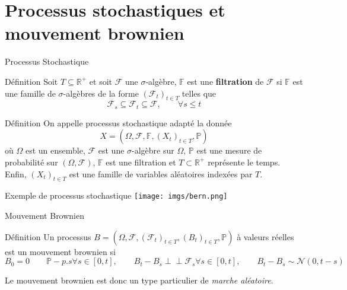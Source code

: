 \documentclass{beamer}
\newcommand{\1}{\mathmybb{1}}
\newcommand{\indep}{\perp \!\!\! \perp}
\begin{document}
\section{Processus stochastiques et mouvement brownien}
\begin{frame}{Processus Stochastique}
  \begin{block}{Définition}
    Soit $T \subseteq \mathbb{R}^{+}$ et soit $\mathcal{F}$ une $\sigma$-algèbre, $\mathbb{F}$ est une \textbf{filtration} de $\mathcal{F}$ si $\mathbb{F}$ est une famille de $\sigma$-algèbres de la forme $\left( \mathcal{F}_{t}\right)_{t\in T}$ telles que
    \[
      \mathcal{F}_{s} \subseteq \mathcal{F}_{t} \subseteq \mathcal{F}, \qquad \forall s \leq t
    \]
    \end{block}
  \begin{block}{Définition}
    On appelle processus stochastique adapté la donnée
    \begin{equation}
      X = (\varOmega, \mathcal{F}, \mathbb{F}, \left(  X_{t} \right)_{t\in T}, \mathbb{P})
    \end{equation}
    où $ \varOmega $ est un ensemble, $ \mathcal{F} $ est une $\sigma$-algèbre sur $ \varOmega $, $\mathbb{P}$ est une mesure de probabilité sur $ \left( \varOmega , \mathcal{F} \right)$, $\mathbb{F}$ est une filtration et $T \subset \mathbb{R}^{+}$ représente le temps.
    Enfin, $\left( X_{t} \right)_{t\in T} $  est une famille de variables aléatoires indexées par $ T $.
  \end{block}
\end{frame}
\begin{frame}{Exemple de processus stochastique}
  \texttt{[image: imgs/bern.png]}
\end{frame}
\begin{frame}{Mouvement Brownien}
  \begin{block}{Définition}
    Un processus $ B = (\varOmega, \mathcal{F}, \left(  \mathcal{F}_{t} \right)_{t\in T},\left(  B_{t} \right)_{t\in T}, \mathbb{P} ) $ à valeurs réelles est un mouvement brownien si
    \begin{subequations}
      \begin{equation} B_{0} = 0 \qquad \mathbb{P}-p.s \end{equation}
      \begin{equation} \forall s \in \left[0, t\right], \qquad B_{t} - B_{s} \indep \mathcal{F}_{s} \end{equation}
      \begin{equation} \forall s \in \left[0, t\right], \qquad B_{t} - B_{s} \sim \mathcal{N} \left( 0, t-s\right)\end{equation}
      \end{subequations}
    \end{block}
    Le mouvement brownien est donc un type particulier de {\em marche aléatoire}.
\end{frame}
\end{document}
